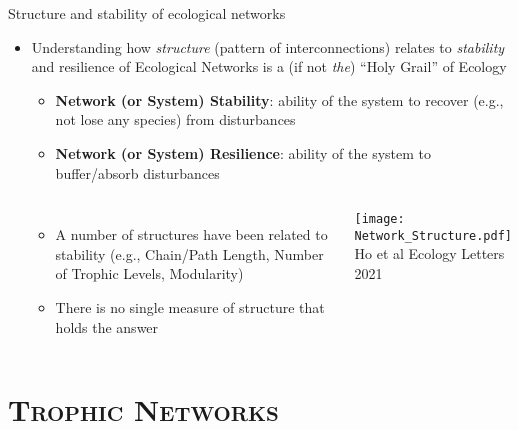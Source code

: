 \begin{frame}{Structure and stability of ecological networks}
  
\begin{itemize}[<+->]\itemsep0pt
  
  \item Understanding how {\it structure} (pattern of interconnections) relates to {\it stability} and resilience of Ecological Networks is a (if not {\it the}) ``Holy Grail'' of Ecology
  \begin{itemize}
    \item {\bf Network (or System) Stability}: ability of the system to recover (e.g., not lose any species) from disturbances
    \item   {\bf Network (or System) Resilience}: ability of the system to buffer/absorb disturbances
  \end{itemize}
  \pause
  \begin{columns}[c]
      \begin{itemize}[<+->]\setlength{\itemindent}{-1em}\itemsep4pt
        \item A number of structures have been related to stability (e.g., Chain/Path Length, Number of Trophic Levels, Modularity)
        \item There is no single measure of structure that holds the answer
      \end{itemize}
    \centering
    \texttt{[image: Network\_Structure.pdf]}\\
    {\tiny Ho et al Ecology Letters 2021}  
  \end{columns}

\end{itemize} 

\end{frame}
  
\section{\scshape Trophic Networks}

